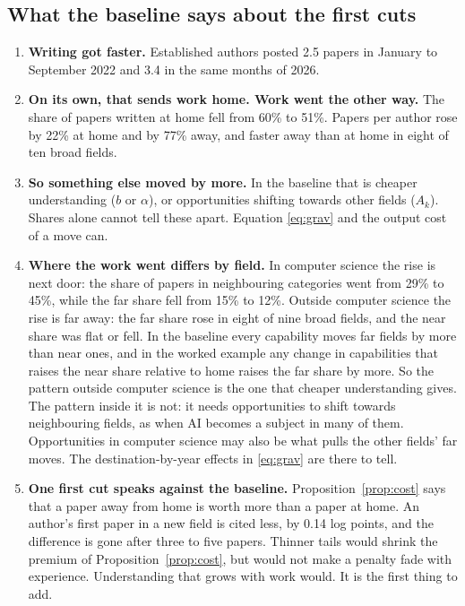 \documentclass[11pt,letterpaper]{article}
\begin{document}
\subsection{What the baseline says about the first cuts}

\begin{enumerate}[leftmargin=1.7em]
\item \textbf{Writing got faster.} Established authors posted 2.5 papers in January to September 2022 and 3.4 in the same months of 2026.
\item \textbf{On its own, that sends work home. Work went the other way.} The share of papers written at home fell from 60\% to 51\%. Papers per author rose by 22\% at home and by 77\% away, and faster away than at home in eight of ten broad fields.
\item \textbf{So something else moved by more.} In the baseline that is cheaper understanding ($b$ or $\alpha$), or opportunities shifting towards other fields ($A_k$). Shares alone cannot tell these apart. Equation \eqref{eq:grav} and the output cost of a move can.
\item \textbf{Where the work went differs by field.} In computer science the rise is next door: the share of papers in neighbouring categories went from 29\% to 45\%, while the far share fell from 15\% to 12\%. Outside computer science the rise is far away: the far share rose in eight of nine broad fields, and the near share was flat or fell. In the baseline every capability moves far fields by more than near ones, and in the worked example any change in capabilities that raises the near share relative to home raises the far share by more. So the pattern outside computer science is the one that cheaper understanding gives. The pattern inside it is not: it needs opportunities to shift towards neighbouring fields, as when AI becomes a subject in many of them. Opportunities in computer science may also be what pulls the other fields' far moves. The destination-by-year effects in \eqref{eq:grav} are there to tell.
\item \textbf{One first cut speaks against the baseline.} Proposition~\ref{prop:cost} says that a paper away from home is worth more than a paper at home. An author's first paper in a new field is cited less, by 0.14 log points, and the difference is gone after three to five papers. Thinner tails would shrink the premium of Proposition~\ref{prop:cost}, but would not make a penalty fade with experience. Understanding that grows with work would. It is the first thing to add.
\end{enumerate}
\end{document}
